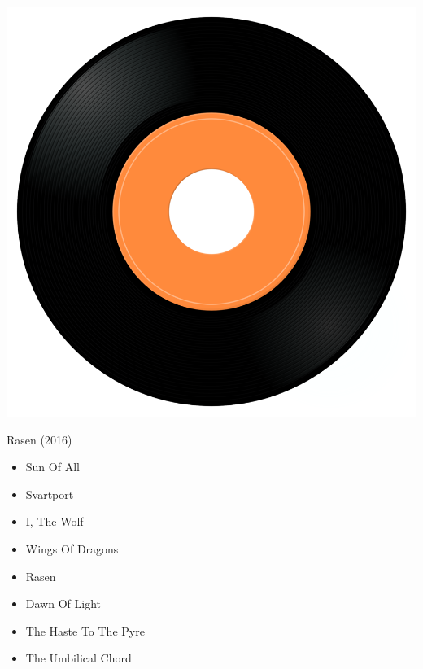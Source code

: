 \begin{minipage}[t]{0.25\textwidth}\vspace{0pt}
\captionsetup{type=figure}
\includegraphics[width=\textwidth]{Images/cover.png}
\caption*{Rasen (2016)}
\end{minipage}
\begin{minipage}[t]{0.25\textwidth}\vspace{0pt}
\begin{itemize}[nosep,leftmargin=1em,labelwidth=*,align=left]
	\setlength{\itemsep}{0pt}
	\item Sun Of All
	\item Svartport
	\item I, The Wolf
	\item Wings Of Dragons
	\item Rasen
	\item Dawn Of Light
	\item The Haste To The Pyre
	\item The Umbilical Chord
\end{itemize}
\end{minipage}
